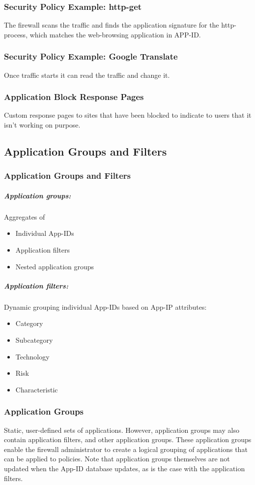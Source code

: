 \subsubsection{Security Policy Example:  http-get}
The firewall scans the traffic and finds the application signature for the http-process, which matches the web-browsing application in APP-ID.

\subsubsection{Security Policy Example:  Google Translate}
Once traffic starts it can read the traffic and change it. 

\subsubsection{Application Block Response Pages}
Custom response pages to sites that have been blocked to indicate to users that it isn't working on purpose.

\subsection{Application Groups and Filters}
\subsubsection{Application Groups and Filters}
\subparagraph{Application groups:}  Aggregates of
    \begin{itemize}
        \item Individual App-IDs
        \item Application filters
        \item Nested application groups
    \end{itemize}
\subparagraph{Application filters:} 
Dynamic grouping 
individual App-IDs based on App-IP attributes:
    \begin{itemize}
        \item Category
        \item Subcategory
        \item Technology
        \item Risk
        \item Characteristic
    \end{itemize}
\subsubsection{Application Groups}
Static, user-defined sets of applications. However, application groups may also contain application filters, and other application groups. 
These application groups enable the firewall administrator to create a logical grouping of applications that can be applied to policies. 
Note that application groups themselves are not updated when the App-ID database updates, as is the case with the application filters.

